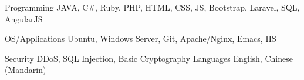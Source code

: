 

\begin{cvskills}

  \cvskill
    {Programming} %
    {JAVA, C\#, Ruby, PHP, HTML, CSS, JS, Bootstrap, Laravel, SQL, AngularJS} %

  \cvskill
    {OS/Applications} %
    {Ubuntu, Windows Server, Git, Apache/Nginx, Emacs, IIS} %

  \cvskill
    {Security} %
    {DDoS, SQL Injection, Basic Cryptography} %
  \cvskill
    {Languages} %
    {English, Chinese (Mandarin)} %

\end{cvskills}


